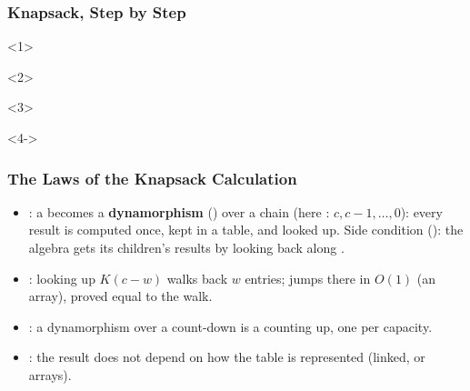 \begin{frame*}[vertical-alignment = top]
  \frametitle{Knapsack, Step by Step}
  \vspace*{4mm}
  \begin{onlyenv}<1>
  \end{onlyenv}
  \begin{onlyenv}<2>
  \end{onlyenv}
  \begin{onlyenv}<3>
  \end{onlyenv}
  \begin{onlyenv}<4->
  \end{onlyenv}
  \par
\end{frame*}

\begin{frame}
  \frametitle{The Laws of the Knapsack Calculation}
  \small
  \begin{itemize}
    \item {}: a  becomes a
      \textbf{dynamorphism} () over a chain  (here
      : $c, c - 1, \ldots, 0$): every result is computed
      once, kept in a table, and looked up. Side condition ():
      the algebra gets its children's results by looking back along
      .
    \item {}: looking up
      $K(c - w)$ walks back $w$ entries;  jumps there in
      $O(1)$ (an array), proved equal to the walk.
    \item {}: a dynamorphism over a count-down is a
       counting up, one  per capacity.
    \item {}: the result does not depend on how the table is
      represented (linked, or arrays).
  \end{itemize}
\end{frame}

